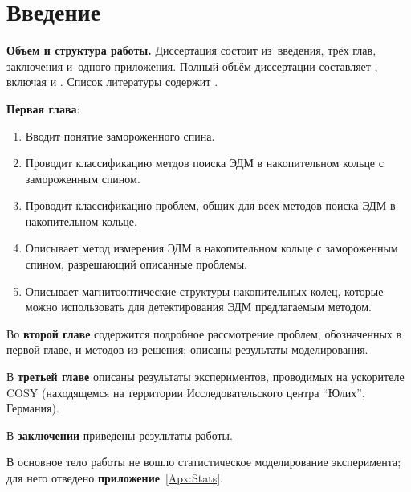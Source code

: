 \chapter*{Введение}                         %

\newcommand{\actuality}{}
\newcommand{\progress}{}
\newcommand{\aim}{{\textbf\aimTXT}}
\newcommand{\tasks}{\textbf{\tasksTXT}}
\newcommand{\novelty}{\textbf{\noveltyTXT}}
\newcommand{\influence}{\textbf{\influenceTXT}}
\newcommand{\methods}{\textbf{\methodsTXT}}
\newcommand{\defpositions}{\textbf{\defpositionsTXT}}
\newcommand{\reliability}{\textbf{\reliabilityTXT}}
\newcommand{\probation}{\textbf{\probationTXT}}
\newcommand{\contribution}{\textbf{\contributionTXT}}
\newcommand{\publications}{\textbf{\publicationsTXT}}


\textbf{Объем и структура работы.} Диссертация состоит из~введения, трёх глав,
заключения и~одного приложения.
%
Полный объём диссертации составляет
, включая
 и
.   Список литературы содержит
.

\textbf{Первая глава}: 
\begin{enumerate}
	\item Вводит понятие замороженного спина.
	\item Проводит классификацию метдов поиска ЭДМ в накопительном кольце с замороженным спином.
	\item Проводит классификацию проблем, общих для всех методов поиска ЭДМ в накопительном кольце.
	\item Описывает метод измерения ЭДМ в накопительном кольце с замороженным спином, разрешающий описанные проблемы.
	\item Описывает магнитооптические структуры накопительных колец, которые можно использовать для детектирования ЭДМ предлагаемым методом.
\end{enumerate}

Во \textbf{второй главе} содержится подробное рассмотрение проблем, обозначенных в первой главе, и методов из решения; описаны результаты моделирования. 

В \textbf{третьей главе} описаны результаты экспериментов, проводимых на ускорителе COSY (находящемся на территории Исследовательского центра ``Юлих'', Германия).

В \textbf{заключении} приведены результаты работы.

В основное тело работы не вошло статистическое моделирование эксперимента; для него отведено \textbf{приложение}~\ref{Apx:Stats}.